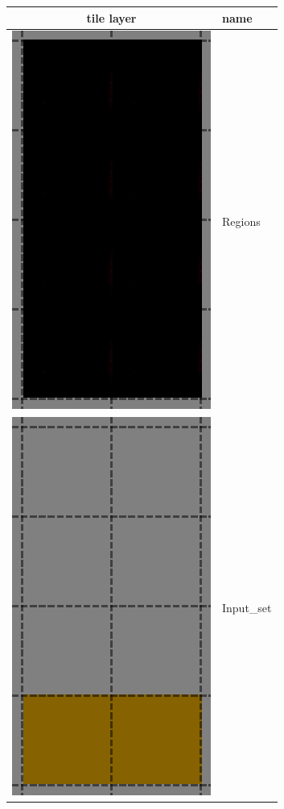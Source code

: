 \begin{figure}
   \begin{tabular}{|c|l|}
   \hline
   tile layer & name \\
   \hline
   \hline
	\includegraphics[scale=0.5]{Example/LoneCoder/alternatingwalls/regions.eps} & Regions \\
	\hline
	\includegraphics[scale=0.5]{Example/LoneCoder/alternatingwalls/input.eps} & Input\_set\\

\end{tabular}
\end{figure}
